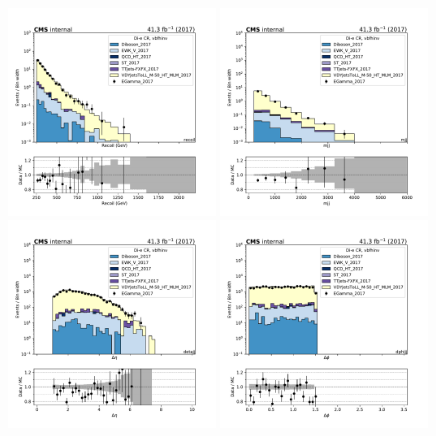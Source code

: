 \begin{figure}[htbp]
    \begin{center}
        \includegraphics[width=0.49\textwidth]{fig/datamc/cr_2e_vbf/cr_2e_vbf_recoil_losf_2017.pdf}
        \includegraphics[width=0.49\textwidth]{fig/datamc/cr_2e_vbf/cr_2e_vbf_mjj_losf_2017.pdf} \\
        \includegraphics[width=0.49\textwidth]{fig/datamc/cr_2e_vbf/cr_2e_vbf_detajj_losf_2017.pdf}
        \includegraphics[width=0.49\textwidth]{fig/datamc/cr_2e_vbf/cr_2e_vbf_dphijj_losf_2017.pdf}

\end{center}
\end{figure}
